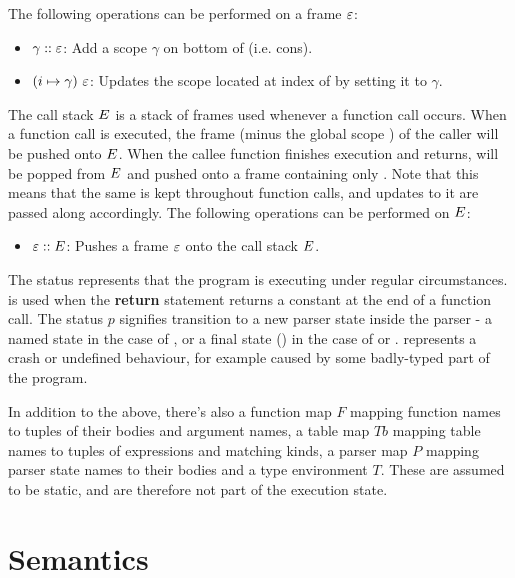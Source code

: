 \documentclass[UTF8]{article}
\begin{document}
The following operations can be performed on a frame $\varepsilon$:
\begin{itemize}
\item $ \gamma :: \varepsilon$: Add a scope $\gamma$ on bottom of \currsf{} (i.e. cons).
\item $(i \mapsto  \gamma) \,\, \varepsilon$: Updates the scope located at index \num{} of \currsf{} by setting it to $\gamma$.
\end{itemize}

The call stack $E$ is a stack of frames used whenever a function call occurs. When a function call is executed, the frame \currsf{} (minus the global scope \gscope{}) of the caller will be pushed onto $E$. When the callee function finishes execution and returns, \currsf{} will be popped from $E$ and pushed onto a frame containing only \gscope{}. Note that this means that the same \gscope{} is kept throughout function calls, and updates to it are passed along accordingly. The following operations can be performed on $E$: 
\begin{itemize}
\item $ \varepsilon :: E$: Pushes a frame $\varepsilon$ onto the call stack $E$.
\end{itemize}

The status \running{} represents that the program is executing under regular circumstances.  is used when the \textbf{return} statement returns a constant \cval{} at the end of a function call. The status $p$ signifies transition to a new parser state inside the parser - a named state in the case of \trans{\vn{}}, or a final state (\pfin{}) in the case of \accept{} or \reject{}. \sterr{} represents a crash or undefined behaviour, for example caused by some badly-typed part of the program. 

In addition to the above, there's also a function map $F$ mapping function names to tuples of their bodies and argument names, a table map $\mathit{Tb}$ mapping table names to tuples of expressions and matching kinds, a parser map $P$ mapping parser state names to their bodies and a type environment $T$. These are assumed to be static, and are therefore not part of the execution state.

\section{Semantics}
\end{document}
